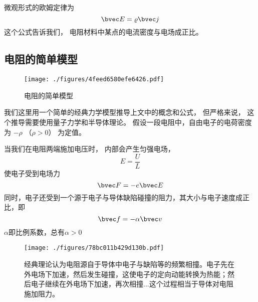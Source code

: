 微观形式的欧姆定律为
\begin{equation}
\bvec E = \varrho\bvec j
\end{equation}
这个公式告诉我们， 电阻材料中某点的电流密度与电场成正比。

\subsection{电阻的简单模型}
\begin{figure}[ht]
\centering
\texttt{[image: ./figures/4feed6580efe6426.pdf]}
\caption{电阻的简单模型} \label{fig_Resist_1}
\end{figure}

我们这里用一个简单的经典力学模型推导上文中的概念和公式， 但严格来说， 这个推导需要使用量子力学和半导体理论。 假设一段电阻中，自由电子的电荷密度为 $-\rho$ （$\rho > 0$） 为定值。

当我们在电阻两端施加电压时， 内部会产生匀强电场，
\begin{equation}\label{eq_Resist_6}
E = \frac UL
\end{equation}
使电子受到电场力
\begin{equation}
\bvec F = -e\bvec E
\end{equation}
同时，电子还受到一个源于电子与导体缺陷碰撞的阻力，其大小与电子速度成正比，即
\begin{equation}
\bvec f = -\alpha \bvec v
\end{equation}
$\alpha$即比例系数，总有$\alpha>0$

\begin{figure}[ht]
\centering
\texttt{[image: ./figures/78bc011b429d130b.pdf]}
\caption{经典理论认为电阻源自于导体中电子与缺陷等的频繁相撞。电子先在外电场下加速，然后发生碰撞，这使电子的定向动能转换为热能；然后电子继续在外电场下加速，再次相撞...这个过程相当于导体对电阻施加阻力。} \label{fig_Resist_4}
\end{figure}

